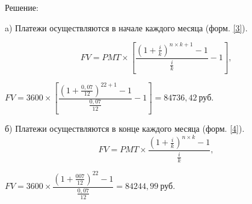 Решение:

a) Платежи осуществляются в начале каждого месяца (форм. \ref{3}).

\begin{equation}\label{3}
FV = PMT \times \left[\dfrac{\left(1+\frac{i}{k}\right)^{n \times k +1}-1}{\frac{i}{k}}-1 \right],
\end{equation}

$ FV = 3600\times \left[\dfrac{\left(1+\frac{0,07}{12}\right)^{22+1}-1}{\frac{0,07}{12}}-1 \right] = 84736,42 \  \text{руб.}   $

б) Платежи осуществляются в конце каждого месяца (форм. \ref{4}).
\begin{equation}\label{4}
FV =PMT \times \dfrac{(1+\frac{i}{k})^{n \times k}-1}{\frac{i}{k}},
\end{equation}

$ FV =3600 \times \dfrac{(1+\frac{007}{12})^{22}-1}{\frac{0,07}{12}} = 84244,99 \  \text{руб.} $


